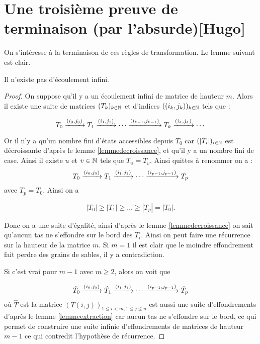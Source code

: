 \section{Une troisième preuve de terminaison (par l'absurde)[Hugo]}

On s'intéresse à la terminaison de ces règles de transformation. Le lemme suivant est clair.

\begin{theo}
Il n'existe pas d'écoulement infini.
\end{theo}

\begin{proof}
On suppose qu'il y a un écoulement infini de matrice de hauteur $m$. Alors il existe une suite de matrices $(T_k)_{k\in\mathbb{N}}$ et d'indices $((i_k,j_k))_{k\in\mathbb{N}}$ tels que :

$$T_0\xrightarrow{(i_{0},j_{0})}T_1\xrightarrow{(i_{1},j_{1})} \cdots \xrightarrow{(i_{k-1},j_{k-1})} T_k \xrightarrow{(i_{k},j_{k})} \cdots$$

Or il n'y a qu'un nombre fini d'états accessibles depuis $T_0$ car $(|T_i|)_{i\in\mathbb{N}}$ est décroissante d'après le lemme \ref{lemmedecroissance}, et qu'il y a un nombre fini de case. Ainsi il existe $u$ et $v \in\mathbb{N}$ tels que $T_u=T_v$. Ainsi quittes à renommer on a :
$$T_0\xrightarrow{(i_{0},j_{0})}T_1\xrightarrow{(i_{1},j_{1})} \cdots \xrightarrow{(i_{p-1},j_{p-1})} T_p$$
 avec $T_p=T_0$. Ainsi on a 
 
 $$ |T_0|\geq|T_1|\geq\ldots\geq|T_p|=|T_0|.$$
 
 Donc on a une suite d'égalité, ainsi d'après le lemme \ref{lemmedecroissance} on sait qu'aucun tas ne s'effondre sur le bord des $T_i$.
\medbreak
Ainsi on peut faire une récurrence sur la hauteur de la matrice $m$. Si $m=1$ il est clair que le moindre effondrement fait perdre des grains de sables, il y a contradiction. 

Si c'est vrai pour $m-1$ avec $m\geq 2$, alors on voit que 

$$\hat{T}_0\xrightarrow{(i_{0},j_{0})}\hat{T}_1\xrightarrow{(i_{1},j_{1})} \cdots \xrightarrow{(i_{p-1},j_{p-1})} \hat{T}_p$$
où $\hat{T}$ est la matrice $(T(i,j))_{1\leq i <m,1\leq j\leq n}$ est aussi une suite d'effondrements d'après le lemme \ref{lemmeextraction} car aucun tas ne s'effondre sur le bord, ce qui permet de construire une suite infinie d'effondrements de matrices de hauteur $m-1$ ce qui contredit l'hypothèse de récurrence.

\end{proof}

